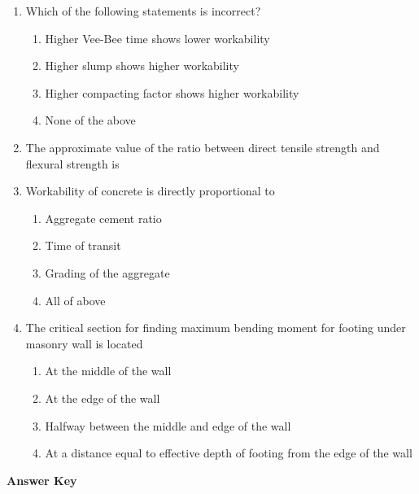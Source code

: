 \documentclass[11pt,a4paper]{article}
\begin{document}
\begin{enumerate}
\item{Which of the following statements is incorrect?}
\begin{enumerate}[label=\Alph*.]
\item{Higher Vee-Bee time shows lower workability}
\item{Higher slump shows higher workability}
\item{Higher compacting factor shows higher workability}
\item{None of the above}
\end{enumerate}
\item{The approximate value of the ratio between direct tensile strength and flexural strength is}
\\
\item{Workability of concrete is directly proportional to}
\begin{enumerate}[label=\Alph*.]
\item{Aggregate cement ratio}
\item{Time of transit}
\item{Grading of the aggregate}
\item{All of above}
\end{enumerate}
\item{The critical section for finding maximum bending moment for footing under masonry wall is located}
\begin{enumerate}[label=\Alph*.]
\item{At the middle of the wall}
\item{At the edge of the wall}
\item{Halfway between the middle and edge of the wall}
\item{At a distance equal to effective depth of footing from the edge of the wall}
\end{enumerate}
\end{enumerate}
\textbf{Answer Key}
\end{document}

